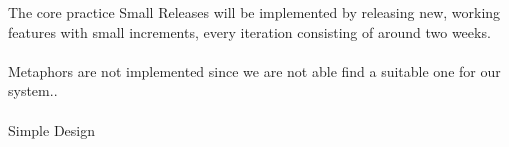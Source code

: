 The core practice Small Releases will be implemented by releasing new, working features with small increments, every iteration consisting of around two weeks.\\\\

Metaphors are not implemented since we are not able find a suitable one for our system..\\\\

Simple Design 
